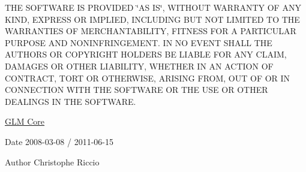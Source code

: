 \-T\-H\-E \-S\-O\-F\-T\-W\-A\-R\-E \-I\-S \-P\-R\-O\-V\-I\-D\-E\-D \char`\"{}\-A\-S I\-S\char`\"{}, \-W\-I\-T\-H\-O\-U\-T \-W\-A\-R\-R\-A\-N\-T\-Y \-O\-F \-A\-N\-Y \-K\-I\-N\-D, \-E\-X\-P\-R\-E\-S\-S \-O\-R \-I\-M\-P\-L\-I\-E\-D, \-I\-N\-C\-L\-U\-D\-I\-N\-G \-B\-U\-T \-N\-O\-T \-L\-I\-M\-I\-T\-E\-D \-T\-O \-T\-H\-E \-W\-A\-R\-R\-A\-N\-T\-I\-E\-S \-O\-F \-M\-E\-R\-C\-H\-A\-N\-T\-A\-B\-I\-L\-I\-T\-Y, \-F\-I\-T\-N\-E\-S\-S \-F\-O\-R \-A \-P\-A\-R\-T\-I\-C\-U\-L\-A\-R \-P\-U\-R\-P\-O\-S\-E \-A\-N\-D \-N\-O\-N\-I\-N\-F\-R\-I\-N\-G\-E\-M\-E\-N\-T. \-I\-N \-N\-O \-E\-V\-E\-N\-T \-S\-H\-A\-L\-L \-T\-H\-E \-A\-U\-T\-H\-O\-R\-S \-O\-R \-C\-O\-P\-Y\-R\-I\-G\-H\-T \-H\-O\-L\-D\-E\-R\-S \-B\-E \-L\-I\-A\-B\-L\-E \-F\-O\-R \-A\-N\-Y \-C\-L\-A\-I\-M, \-D\-A\-M\-A\-G\-E\-S \-O\-R \-O\-T\-H\-E\-R \-L\-I\-A\-B\-I\-L\-I\-T\-Y, \-W\-H\-E\-T\-H\-E\-R \-I\-N \-A\-N \-A\-C\-T\-I\-O\-N \-O\-F \-C\-O\-N\-T\-R\-A\-C\-T, \-T\-O\-R\-T \-O\-R \-O\-T\-H\-E\-R\-W\-I\-S\-E, \-A\-R\-I\-S\-I\-N\-G \-F\-R\-O\-M, \-O\-U\-T \-O\-F \-O\-R \-I\-N \-C\-O\-N\-N\-E\-C\-T\-I\-O\-N \-W\-I\-T\-H \-T\-H\-E \-S\-O\-F\-T\-W\-A\-R\-E \-O\-R \-T\-H\-E \-U\-S\-E \-O\-R \-O\-T\-H\-E\-R \-D\-E\-A\-L\-I\-N\-G\-S \-I\-N \-T\-H\-E \-S\-O\-F\-T\-W\-A\-R\-E.

\hyperlink{group__core}{\-G\-L\-M \-Core}

\begin{DoxyDate}{\-Date}
2008-\/03-\/08 / 2011-\/06-\/15 
\end{DoxyDate}
\begin{DoxyAuthor}{\-Author}
\-Christophe \-Riccio 
\end{DoxyAuthor}
